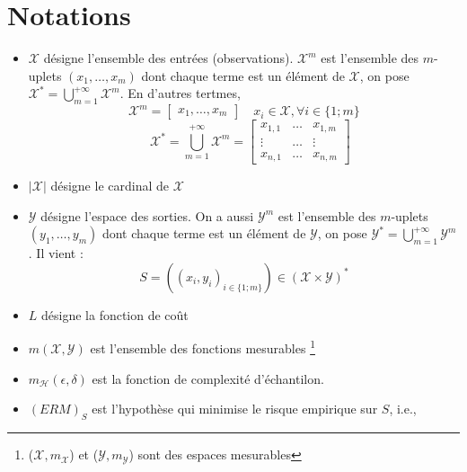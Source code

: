 \chapter*{Notations}

\begin{itemize}
    \item $\mathcal{X}$ désigne l'ensemble des entrées (observations). $\mathcal{X}^m$ est l'ensemble des $m$-uplets $(x_1, \dots, x_m)$
    dont chaque terme est un élément de $\mathcal{X}$, on pose $\mathcal{X}^{*} = \bigcup_{m=1}^{+\infty} \mathcal{X}^{m}$.
    En d'autres tertmes, 
    \[
    \mathcal{X}^m = 
    \begin{bmatrix}
        x_1, \dots, x_m
    \end{bmatrix}
    \quad x_i \in \mathcal{X}, \forall i \in \{1;m\}
    \]
    \[
    \quad \mathcal{X}^{*} =\bigcup_{m=1}^{+\infty} \mathcal{X}^{m} =
    \begin{bmatrix}
        x_{1,1} & \dots & x_{1,m} \\
        \vdots   & \dots & \vdots \\
        x_{n,1} & \dots & x_{n,m}
    \end{bmatrix}
    \]
    \newline
    \item $|\mathcal{X}|$ désigne le cardinal de $\mathcal{X}$ \newline 
    \item $\mathcal{Y}$ désigne l'espace des sorties. On a aussi $\mathcal{Y}^m$ est l'ensemble des $m$-uplets $(y_1, \dots, y_m)$
    dont chaque terme est un élément de $\mathcal{Y}$, on pose $\mathcal{Y}^{*} = \bigcup_{m=1}^{+\infty} \mathcal{Y}^{m}$. 
    Il vient :
    \begin{equation}
        S = ((x_i, y_i)_{i \in \{1;m\}}) \in (\mathcal{X} \times \mathcal{Y})^{*} \nonumber
    \end{equation}
    \item $L$ désigne la fonction de coût \newline
    \item $m(\mathcal{X}, \mathcal{Y})$ est l'ensemble des fonctions mesurables \footnote{
        ($\mathcal{X}, m_{\mathcal{X}}$) et ($\mathcal{Y}, m_{\mathcal{Y}}$) sont des espaces mesurables
    } \newline
    \item $m_{\mathcal{H}}(\epsilon, \delta)$ est la fonction de complexité d'échantilon. \newline
    \item $(ERM)_S$ est l'hypothèse qui minimise le risque empirique sur $S$, i.e., 

\end{itemize}
